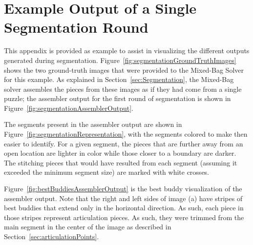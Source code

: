 \chapter{Example Output of a Single Segmentation Round\label{app:segmentedOutput}}

This appendix is provided as example to assist in visualizing the different outputs generated during segmentation.  Figure~\ref{fig:segmentationGroundTruthImages} shows the two ground-truth images that were provided to the Mixed-Bag Solver for this example.  As explained in Section~\ref{sec:Segmentation}, the Mixed-Bag solver assembles the pieces from these images as if they had come from a single puzzle; the assembler output for the first round of segmentation is shown in Figure~\ref{fig:segmentationAssemblerOutput}.

The segments present in the assembler output are shown in Figure~\ref{fig:segmentationRepresentation}, with the segments colored to make then easier to identify.  For a given segment, the pieces that are further away from an open location are lighter in color while those closer to a boundary are darker.  The stitching pieces that would have resulted from each segment (assuming it exceeded the minimum segment size) are marked with white crosses.

Figure~\ref{fig:bestBuddiesAssemblerOutput} is the best buddy visualization of the assembler output.  Note that the right and left sides of image (a) have stripes of best buddies that extend only in the horizontal direction.  As such, each piece in those stripes represent articulation pieces.  As such, they were trimmed from the main segment in the center of the image as described in Section~\ref{sec:articulationPoints}.

